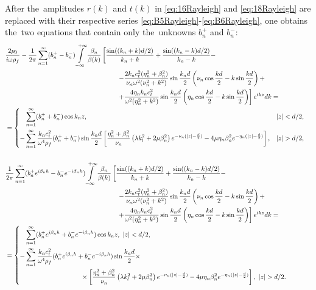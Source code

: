 After the~amplitudes $r(k)$ and $t(k)$ in \cref{eq:16Rayleigh} and \cref{eq:18Rayleigh} are replaced with their respective series \cref{eq:B5Rayleigh}-\cref{eq:B6Rayleigh}, one obtains the~two equations that contain only the~unknowns $b_n^{+}$ and $b_n^{-}$:
\begin{align}
&\frac{2p_0}{i\omega\rho_f}
-\frac{1}{2 \pi}\sum\limits_{n=1}^{\infty}({b_n^+}-{b_n^-})\int\limits_{-\infty}^{+\infty}\frac{\beta_n}{\beta(k)}\left[\frac{\sin((k_n+k)d/2)}{k_n+k}+\frac{\sin((k_n-k)d/2)}{k_n-k}-\right. \label{eq:22Rayleigh}\\
%
&\hspace{6cm}\left.-\frac{2k_n c_t^2(\eta_n^2+\beta_n^2)}{\nu_n\omega^2(\nu_n^2+k^2)}\sin\frac{k_nd}{2} \left(\nu_n \cos\frac{kd}{2}-k\sin\frac{kd}{2}\right) + \right. \notag \\
&\hspace{6cm}\left.+ \frac{4\eta_n k_nc_t^2}{\omega^2(\eta_n^2+k^2)}\sin\frac{k_nd}{2} \left(\eta_n \cos\frac{kd}{2}-k\sin\frac{kd}{2}\right)\right] e^{ikz}dk = \notag\\
%
&=
\left\{
\begin{aligned}
  & \sum\limits_{n=1}^{\infty}({b_n^+}+{b_n^-})\cos{k_nz}, &|z|<d/2, \\
- & \sum\limits_{n=1}^{\infty}\frac{k_n c_t^2}{\omega^4\rho_f}
({b_n^+}+{b_n^-})\sin\frac{k_nd}{2}\left[\frac{\eta_n^2+\beta_n^2}{\nu_n}\left(\lambda k_l^2+2\mu\beta_n^2\right)e^{-\nu_n (|z|-\frac{d}{2})} -
4\mu \eta_n \beta_n^2 e^{-\eta_n (|z|-\frac{d}{2})}\right], &|z|>d/2,
\end{aligned}
\right. \notag \\
& & \notag\\
&\frac{1}{2 \pi}\sum\limits_{n=1}^{\infty}({b_n^+}e^{i\beta_nh}-{b_n^-}e^{-i\beta_nh})
\int\limits_{-\infty}^{+\infty}\frac{\beta_n}{\beta(k)}\left[\frac{\sin((k_n+k)d/2)}{k_n+k}+\frac{\sin((k_n-k)d/2)}{k_n-k}-\right. \label{eq:23Rayleigh}\\
%
&\hspace{6cm}\left.-\frac{2k_n c_t^2(\eta_n^2+\beta_n^2)}{\nu_n\omega^2(\nu_n^2+k^2)}\sin\frac{k_nd}{2} \left(\nu_n \cos\frac{kd}{2}-k\sin\frac{kd}{2}\right) + \right. \notag \\
&\hspace{6cm}\left.+ \frac{4\eta_n k_nc_t^2}{\omega^2(\eta_n^2+k^2)}\sin\frac{k_nd}{2} \left(\eta_n \cos\frac{kd}{2}-k\sin\frac{kd}{2}\right)\right] e^{ikz}dk = \notag\\
%
&=
\left\{
\begin{aligned}
  & \sum\limits_{n=1}^{\infty}({b_n^+}e^{i\beta_nh}+{b_n^-}e^{-i\beta_nh})\cos{k_nz},\,\, |z|<d/2, \\
- & \sum\limits_{n=1}^{\infty}\frac{k_n c_t^2}{\omega^4\rho_f}
({b_n^+e^{i\beta_nh}}+{b_n^-e^{-i\beta_nh}})\sin\frac{k_nd}{2} \times \\ &\hspace{3cm} \times\left[\frac{\eta_n^2+\beta_n^2}{\nu_n}\left(\lambda k_l^2+2\mu\beta_n^2\right)e^{-\nu_n (|z|-\frac{d}{2})}-
4\mu \eta_n \beta_n^2 e^{-\eta_n (|z|-\frac{d}{2})}\right],\,\, |z|>d/2.
\end{aligned}
\right. \notag
\end{align}

